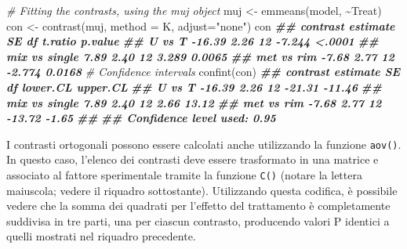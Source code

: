 \documentclass[
  12pt,
]{book}
\newenvironment{Shaded}{\begin{snugshade}}{\end{snugshade}}
\newcommand{\AttributeTok}[1]{\textcolor[rgb]{0.77,0.63,0.00}{#1}}
\newcommand{\CommentTok}[1]{\textcolor[rgb]{0.56,0.35,0.01}{\textit{#1}}}
\newcommand{\DocumentationTok}[1]{\textcolor[rgb]{0.56,0.35,0.01}{\textbf{\textit{#1}}}}
\newcommand{\FunctionTok}[1]{\textcolor[rgb]{0.00,0.00,0.00}{#1}}
\newcommand{\NormalTok}[1]{#1}
\newcommand{\OtherTok}[1]{\textcolor[rgb]{0.56,0.35,0.01}{#1}}
\newcommand{\SpecialCharTok}[1]{\textcolor[rgb]{0.00,0.00,0.00}{#1}}
\newcommand{\StringTok}[1]{\textcolor[rgb]{0.31,0.60,0.02}{#1}}
\begin{document}
\begin{Shaded}
\begin{Highlighting}[]
\CommentTok{\# Fitting the contrasts, using the \textquotesingle{}muj\textquotesingle{} object}
\NormalTok{muj }\OtherTok{\textless{}{-}} \FunctionTok{emmeans}\NormalTok{(model, }\SpecialCharTok{\textasciitilde{}}\NormalTok{Treat)}
\NormalTok{con }\OtherTok{\textless{}{-}} \FunctionTok{contrast}\NormalTok{(muj, }\AttributeTok{method =}\NormalTok{ K, }\AttributeTok{adjust=}\StringTok{"none"}\NormalTok{)}
\NormalTok{con}
\DocumentationTok{\#\#  contrast      estimate   SE df t.ratio p.value}
\DocumentationTok{\#\#  U vs T          {-}16.39 2.26 12  {-}7.244  \textless{}.0001}
\DocumentationTok{\#\#  mix vs single     7.89 2.40 12   3.289  0.0065}
\DocumentationTok{\#\#  met vs rim       {-}7.68 2.77 12  {-}2.774  0.0168}
\CommentTok{\# Confidence intervals}
\FunctionTok{confint}\NormalTok{(con)}
\DocumentationTok{\#\#  contrast      estimate   SE df lower.CL upper.CL}
\DocumentationTok{\#\#  U vs T          {-}16.39 2.26 12   {-}21.31   {-}11.46}
\DocumentationTok{\#\#  mix vs single     7.89 2.40 12     2.66    13.12}
\DocumentationTok{\#\#  met vs rim       {-}7.68 2.77 12   {-}13.72    {-}1.65}
\DocumentationTok{\#\# }
\DocumentationTok{\#\# Confidence level used: 0.95}
\end{Highlighting}
\end{Shaded}

I contrasti ortogonali possono essere calcolati anche utilizzando la funzione \texttt{aov()}. In questo caso, l'elenco dei contrasti deve essere trasformato in una matrice e associato al fattore sperimentale tramite la funzione \texttt{C()} (notare la lettera maiuscola; vedere il riquadro sottostante). Utilizzando questa codifica, è possibile vedere che la somma dei quadrati per l'effetto del trattamento è completamente suddivisa in tre parti, una per ciascun contrasto, producendo valori P identici a quelli mostrati nel riquadro precedente.
\end{document}
